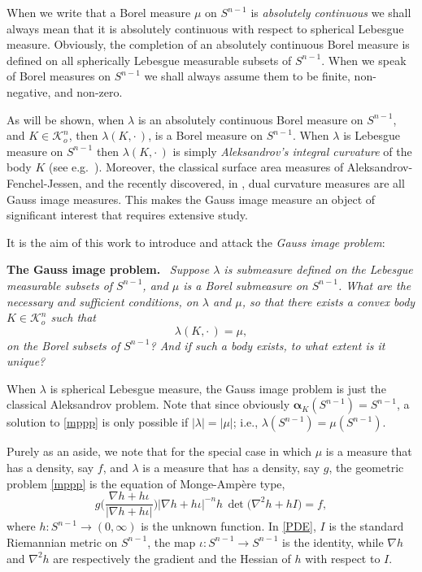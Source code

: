 \documentclass{cpamart1}     %
\theoremstyle{definition}
\theoremstyle{remark}
\newcommand{\sn}{S^{n-1}}
\newcommand{\kno}{\mathcal K^n_o}
\newcommand{\balpha}{\pmb{\alpha}}
\begin{document}
When we write that a Borel measure $\mu$ on $\sn$ is {\it absolutely continuous}
 we shall always mean that it is absolutely continuous with respect to spherical
 Lebesgue measure. Obviously, the completion of an absolutely continuous Borel measure
 is defined on all spherically Lebesgue measurable subsets of $\sn$. When we speak of Borel measures on $\sn$ we shall always assume them to be finite, non-negative, and non-zero. 

As will be shown, when $\lambda$ is an absolutely continuous Borel measure on $\sn$, 
and $K\in\kno$, then $\lambda(K,\cdot\,)$,
is a Borel measure on $\sn$.
When $\lambda$ is Lebesgue measure on $\sn$ then $\lambda(K,\cdot\,)$ is simply
{\it Aleksandrov's integral curvature} of the body $K$ (see e.g.\ \cite{Al4}).
Moreover, the classical surface area measures of Aleksandrov-Fenchel-Jessen,
and the recently discovered, in \cite{HLYZ16},
dual curvature measures are all Gauss image measures. This makes the Gauss image measure an object of significant interest that requires extensive study.


\smallskip

It is the aim of this work to introduce and attack the {\it Gauss image problem}:
\smallskip

\noindent
{\bf The Gauss image problem.}\
{\it
Suppose $\lambda$ is submeasure defined on the Lebesgue measurable subsets of $\sn$,
and $\mu$ is a Borel submeasure on $\sn$.
What are the necessary and sufficient conditions, on $\lambda$ and $\mu$, so that
there exists a convex body
$K\in\kno$ such that
\begin{equation}\label{mppp}
\lambda(K,\cdot\,)=\mu,
\end{equation}
on the Borel subsets of $\sn$? And if such a body exists, to what extent is it unique?
}

When $\lambda$ is spherical Lebesgue measure, the Gauss image problem is just the classical
Aleksandrov problem. Note that since obviously $\balpha_K(\sn)=\sn$, a solution to
\eqref{mppp} is only possible if $|\lambda|=|\mu|$; i.e., $\lambda(\sn)=\mu(\sn)$.



Purely as an aside, we note that for the special case in which $\mu$ is a measure that has a density, say $f$, and $\lambda$ is a measure that has a density, say $g$,
the geometric problem \eqref{mppp} is the equation of Monge-Amp\`ere type,
\begin{equation}\label{PDE}
g\Big(\frac{\nabla h +h \iota}{|\nabla h +h \iota|}\Big)
|\nabla h +h \iota|^{-n}
h\, \det\big(\nabla^2h + h I\big) = f,
\end{equation}
where $h:\sn\to(0,\infty)$ is the unknown function. In \eqref{PDE},  $I$ is the standard Riemannian metric on $\sn$, the map $\iota : \sn \to \sn$ is the identity, while $\nabla h$
and $\nabla^2 h$ are respectively the gradient and the Hessian of $h$ with respect to $I$.
\end{document}
